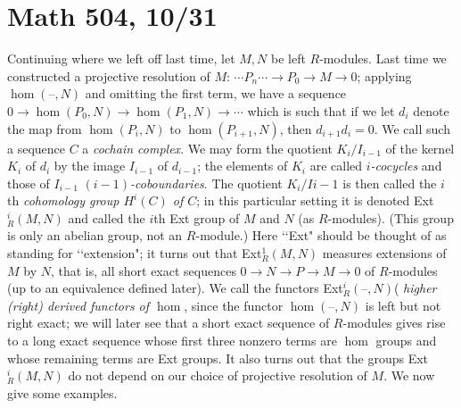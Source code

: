 \documentclass[10pt]{article}
\begin{document}
\section*{Math 504, 10/31}

Continuing where we left off last time, let $M,N$ be left $R$-modules.
Last time we constructed a projective resolution of $M$: $\cdots
P_n\cdots\rightarrow P_0 \rightarrow M\rightarrow 0$; applying
$\hom(\text{--},N)$ and omitting the first term, we have a sequence
$0\rightarrow\hom(P_0,N)\rightarrow\hom(P_1,N)\rightarrow\cdots$ which
is such that if we let $d_i$ denote the map from $\hom(P_i,N)$ to
$\hom(P_{i+1},N)$, then $d_{i+1} d_i = 0$. We call such a sequence $C$ a
{\sl cochain complex}. We may form the quotient $K_i/I_{i-1}$ of the
kernel $K_i$ of $d_i$ by the image $I_{i-1}$ of $d_{i-1}$; the elements
of $K_i$ are called {\sl $i$-cocycles} and those of $I_{i-1}$ {\sl
  $(i-1)$-coboundaries}. The quotient $K_i/I{i-1}$ is then called the
$i$th {\sl cohomology group $H^i(C)$ of $C$}; in this particular setting
it is denoted Ext$_R^i(M,N)$ and called the $i$th Ext group of $M$ and
$N$ (as $R$-modules). (This group is only an abelian group, not an
$R$-module.) Here \lq\lq Ext" should be thought of as standing for
\lq\lq extension"; it turns out that Ext$_R^1(M,N)$ measures extensions
of $M$ by $N$, that is, all short exact sequences $0\rightarrow
N\rightarrow P\rightarrow M\rightarrow 0$ of $R$-modules (up to an
equivalence defined later). We call the functors Ext$_R^i(\text{--},N)$(
{\sl higher (right) derived functors of $\hom$}, since the functor
$\hom(\text{--},N)$ is left but not right exact; we will later see that
a short exact sequence of $R$-modules gives rise to a long exact
sequence whose first three nonzero terms are $\hom$ groups and whose
remaining terms are Ext groups. It also turns out that the groups
Ext$_R^i(M,N)$ do not depend on our choice of projective resolution of
$M$. We now give some examples.
\end{document}
